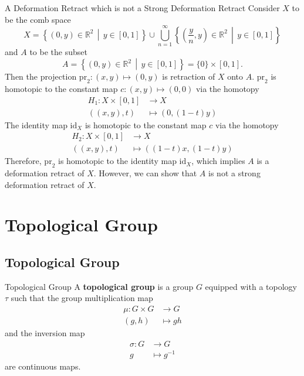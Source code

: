 \documentclass{report}
\newcommand{\midv}{\,\middle\vert\,}
\begin{document}
\begin{example}{A Deformation Retract which is not a Strong Deformation Retract}{}
	Consider $X$ to be the comb space
	\[
		X=\left\{\left(0, y\right) \in \mathbb{R}^{2} \midv y \in[0,1]\right\}\cup \bigcup_{n=1}^{\infty} \left\{\left(\frac{y}{n}, y\right) \in \mathbb{R}^{2} \midv y \in[0,1]\right\}
	\]
	and $A$ to be the subset
	\[
		A=\left\{(0, y) \in \mathbb{R}^{2} \midv y \in[0,1]\right\}=\{0\}\times[0,1].
	\]
	Then the projection $\mathrm{pr}_2:(x, y) \mapsto(0, y)$ is retraction of $X$ onto $A$. $\mathrm{pr}_2$ is homotopic to the constant map $c:(x, y) \mapsto(0, 0)$ via the homotopy
	\begin{align*}
		H_1: X \times[0,1] & \longrightarrow X       \\
		((x, y), t)        & \longmapsto (0, (1-t)y)
	\end{align*}
	The identity map $\mathrm{id}_X$ is homotopic to the constant map $c$ via the homotopy
	\begin{align*}
		H_2: X \times[0,1] & \longrightarrow X            \\
		((x, y), t)        & \longmapsto ((1-t)x, (1-t)y)
	\end{align*}
	Therefore, $\mathrm{pr}_2$ is homotopic to the identity map $\mathrm{id}_X$, which implies $A$ is a deformation retract of $X$. However, we can show that $A$ is not a strong deformation retract of $X$.
\end{example}

\chapter{Topological Group}
\section{Topological Group}
\begin{definition}{Topological Group}{}
	A \textbf{topological group} is a group $G$ equipped with a topology $\tau$ such that the group multiplication map
	\begin{align*}
		\mu:G\times G & \longrightarrow G \\
		(g,h)         & \longmapsto gh
	\end{align*}
	and the inversion map
	\begin{align*}
		\sigma:G & \longrightarrow G  \\
		g        & \longmapsto g^{-1}
	\end{align*}
	are continuous maps.
\end{definition}
\end{document}
